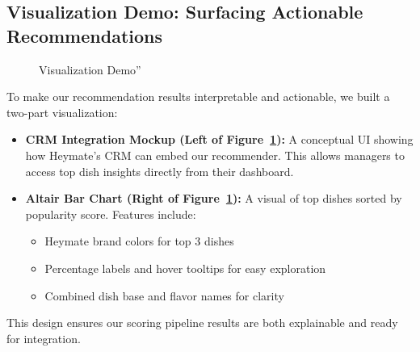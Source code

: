 \documentclass[
  11pt,
  a4paper,
  DIV=11,
  numbers=noendperiod]{scrartcl}
\providecommand{\tightlist}{%
  \setlength{\itemsep}{0pt}\setlength{\parskip}{0pt}}\usepackage{longtable,booktabs,array}
\begin{document}
\subsection{Visualization Demo: Surfacing Actionable
Recommendations}\label{visualization-demo-surfacing-actionable-recommendations}

\begin{figure}

\caption{\label{fig-viz-demo}Visualization Demo''}


\end{figure}%

To make our recommendation results interpretable and actionable, we
built a two-part visualization:

\begin{itemize}
\tightlist
\item
  \textbf{CRM Integration Mockup (Left of Figure~\ref{fig-viz-demo}):} A
  conceptual UI showing how Heymate's CRM can embed our recommender.
  This allows managers to access top dish insights directly from their
  dashboard.
\item
  \textbf{Altair Bar Chart (Right of Figure~\ref{fig-viz-demo}):} A
  visual of top dishes sorted by popularity score. Features include:

  \begin{itemize}
  \tightlist
  \item
    Heymate brand colors for top 3 dishes
  \item
    Percentage labels and hover tooltips for easy exploration
  \item
    Combined dish base and flavor names for clarity
  \end{itemize}
\end{itemize}

This design ensures our scoring pipeline results are both explainable
and ready for integration.
\end{document}
